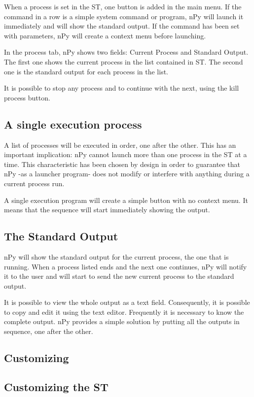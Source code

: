 \documentclass[a4paper,10pt]{article}
\begin{document}
When a process is set in the ST, one button is added in the main menu. If the command in a row is a simple system command or program, nPy will launch it immediately and will show the standard output. If the command has been set with parameters, nPy will create a context menu before launching.

In the process tab, nPy shows two fields: Current Process and Standard Output. The first one shows the current process in the list contained in ST. The second one is the standard output for each process in the list.

It is possible to stop any process and to continue with the next, using the kill process button.

\subsection{A single execution process}

A list of processes will be executed in order, one after the other. This has an important implication: nPy cannot launch more than one process in the ST at a time. This characteristic has been chosen by design in order to guarantee that nPy -as a launcher program- does not modify or interfere with anything during a current process run.

A single execution program will create a simple button with no context menu. It means that the sequence will start immediately showing the output.

\subsection{The Standard Output}

nPy will show the standard output for the current process, the one that is running. When a process listed ends and the next one continues, nPy will notify it to the user and will start to send the new current process to the standard output.

It is possible to view the whole output as a text field. Consequently, it is possible to copy and edit it using the text editor. Frequently it is necessary to know the complete output. nPy provides a simple solution by putting all the outputs in sequence, one after the other.

\subsection{Customizing}

\subsection{Customizing the ST}
\end{document}

